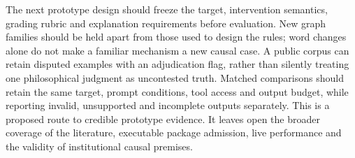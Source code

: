 The next prototype design should freeze the target, intervention semantics,
grading rubric and explanation requirements before evaluation. New graph
families should be held apart from those used to design the rules; word
changes alone do not make a familiar mechanism a new causal case. A public
corpus can retain disputed examples with an adjudication flag, rather than
silently treating one philosophical judgment as uncontested truth. Matched
comparisons should retain the same target, prompt conditions, tool access
and output budget, while reporting invalid, unsupported and incomplete
outputs separately. This is a proposed route to credible prototype evidence.
It leaves open the broader coverage of the literature, executable package
admission, live performance and the validity of institutional causal premises.
